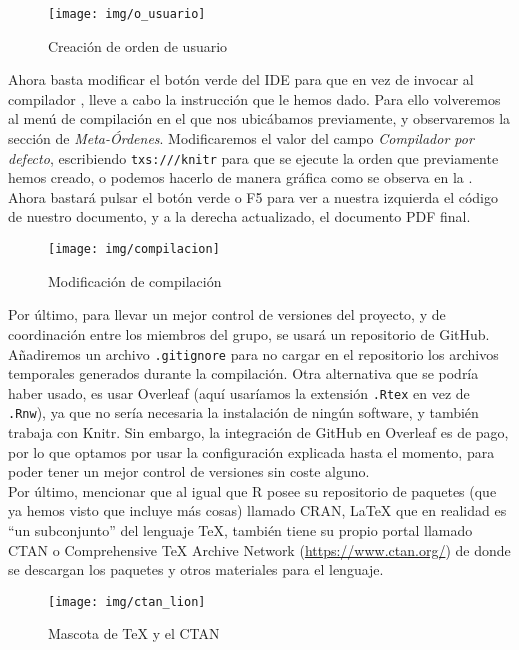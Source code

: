 \documentclass[12pt]{report}\usepackage[]{graphicx}\usepackage[dvipsnames]{xcolor}
\begin{document}
			\begin{figure}[H]
				\centering
				\texttt{[image: img/o\_usuario]}
				\caption{Creación de orden de usuario}
				\label{fig:orden}
			\end{figure}
			
			Ahora basta modificar el botón verde del IDE para que en vez de invocar al compilador , lleve a cabo la instrucción que le hemos dado. Para ello volveremos al menú de compilación en el que nos ubicábamos previamente, y observaremos la sección de \textit{Meta-Órdenes}. Modificaremos el valor del campo \textit{Compilador por defecto}, escribiendo \texttt{txs:///knitr} para que se ejecute la orden que previamente hemos creado, o podemos hacerlo de manera gráfica como se observa en la . Ahora bastará pulsar el botón verde o F5 para ver a nuestra izquierda el código de nuestro documento, y a la derecha actualizado, el documento PDF final. 
			
			\begin{figure}[H]
				\centering
				\texttt{[image: img/compilacion]}
				\caption{Modificación de compilación}
				\label{fig:comp}
			\end{figure}
			
			Por último, para llevar un mejor control de versiones del proyecto, y de coordinación entre los miembros del grupo, se usará un repositorio de GitHub. Añadiremos un archivo \texttt{.gitignore} para no cargar en el repositorio los archivos temporales generados durante la compilación. Otra alternativa que se podría haber usado, es usar Overleaf (aquí usaríamos la extensión \texttt{.Rtex} en vez de \texttt{.Rnw}), ya que no sería necesaria la instalación de ningún software, y también trabaja con Knitr. Sin embargo, la integración de GitHub en Overleaf es de pago, por lo que optamos por usar la configuración explicada hasta el momento, para poder tener un mejor control de versiones sin coste alguno. \\
			
			Por último, mencionar que al igual que R posee su repositorio de paquetes (que ya hemos visto que incluye más cosas) llamado CRAN, \LaTeX{} que en realidad es ``un subconjunto'' del lenguaje \TeX{}, también tiene su propio portal llamado CTAN o Comprehensive \TeX{} Archive Network (\url{https://www.ctan.org/}) de donde se descargan los paquetes y otros materiales para el lenguaje. 
			
			\begin{figure}[H]
				\centering
				\texttt{[image: img/ctan\_lion]}
				\caption{Mascota de \TeX{} y el CTAN}
				\label{fig:leon}
			\end{figure}
			
\end{document}
